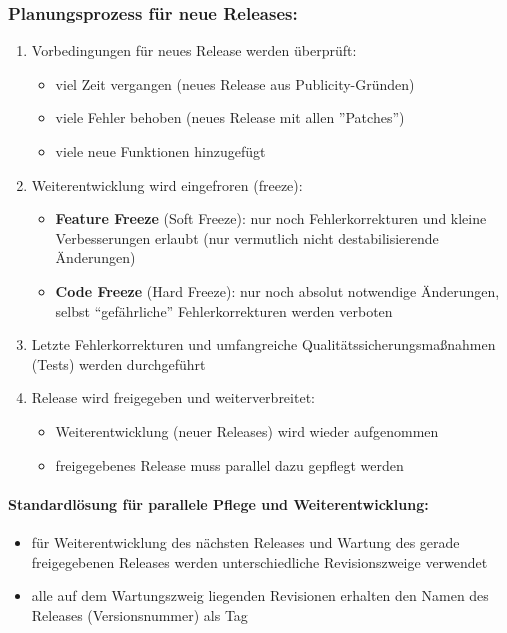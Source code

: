 \subsubsection{Planungsprozess für neue Releases:}
\begin{enumerate}
	\item Vorbedingungen für neues Release werden überprüft:
	\begin{itemize}
		\item viel Zeit vergangen (neues Release aus Publicity-Gründen)
		\item viele Fehler behoben (neues Release mit allen ''Patches'')
		\item viele neue Funktionen hinzugefügt
	\end{itemize}
	\item Weiterentwicklung wird eingefroren (freeze):
	\begin{itemize}
		\item \textbf{Feature Freeze} (Soft Freeze): nur noch Fehlerkorrekturen und kleine Verbesserungen erlaubt (nur vermutlich nicht destabilisierende Änderungen)
		\item  \textbf{Code Freeze} (Hard Freeze): nur noch absolut notwendige Änderungen, selbst ``gefährliche'' Fehlerkorrekturen werden verboten
	\end{itemize}
	\item Letzte Fehlerkorrekturen und umfangreiche Qualitätssicherungsmaßnahmen (Tests) werden durchgeführt
	\item Release wird freigegeben und weiterverbreitet:
	\begin{itemize}
		\item Weiterentwicklung (neuer Releases) wird wieder aufgenommen
		\item freigegebenes Release muss parallel dazu gepflegt werden
	\end{itemize}
\end{enumerate}
\paragraph{Standardlösung für parallele Pflege und Weiterentwicklung:}
\begin{itemize}
	\item für Weiterentwicklung des nächsten Releases und Wartung des gerade freigegebenen Releases werden unterschiedliche Revisionszweige verwendet
	\item alle auf dem Wartungszweig liegenden Revisionen erhalten den Namen des Releases (Versionsnummer) als Tag
\end{itemize}
